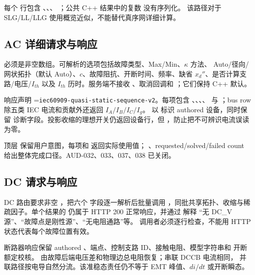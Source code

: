 每个  行包含 、、、
；公共 C++ 结果中的复数  没有序列化。
该路径对于 SLG/LL/LLG 使用概览近似，不能替代真序网详细计算。

\subsection{AC 详细请求与响应}

 必须是非空数组。可解析的选项包括故障类型、Max/Min、$\kappa$ 方法、
Auto/径向/网状拓扑（默认 Auto）、$c$、故障阻抗、开断时间、频率、缺省 $x_d''$、是否计算支路/电压/$I_{th}$ 以及
$I_{th}$ 历时。服务端不接收 、取消回调和
；它们保持 C++ 默认。

响应声明 =\texttt{iec60909-\allowbreak quasi-static-\allowbreak sequence-v2}。每项包含
、、、、
 与 ；bus row
除五类 IEC 电流和贡献外还返回 $I_A/I_B/I_C/I_g$。 以
 标识 authored 设备，同时保留
 诊断字段。投影收缩的理想开关仍返回设备行，但
，防止把不可辨识电流误读为零。

顶层  保留用户意图，每项和  返回实际使用值；
、requested/solved/failed count 给出整体完成口径。AUD-032、033、037、038 已关闭。

\subsection{DC 请求与响应}

DC 路由要求非空 ，把六个  字段逐一解析后批量调用
，同批共享拓扑、收缩与稀疏因子。单个结果的  仍属于 HTTP 200
正常响应，并通过  解释 ``无 DC\_V 源''、``故障点是刚性源''、``无电阻通路''等。
调用者必须逐行检查，不能用 HTTP 状态代表每个故障位置有效。

断路器响应保留 authored 、端点、控制支路 ID、接触电阻、模型字符串和
开断额定校核。 由故障后端电压差和物理边总电阻恢复；串联 DCCB 电流相同，
并联路径按电导自然分流。该准稳态责任仍不等于 EMT 峰值、$di/dt$ 或开断瞬态。

